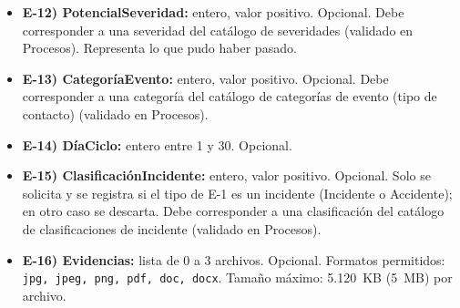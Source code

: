 \begin{itemize}[label={}, leftmargin=1.5em]
  \item \textbf{E-12) PotencialSeveridad:} entero, valor positivo. Opcional. Debe corresponder a una severidad del cat\'alogo de severidades (validado en Procesos). Representa lo que pudo haber pasado.
  \item \textbf{E-13) Categor\'iaEvento:} entero, valor positivo. Opcional. Debe corresponder a una categor\'ia del cat\'alogo de categor\'ias de evento (tipo de contacto) (validado en Procesos).
  \item \textbf{E-14) D\'iaCiclo:} entero entre 1 y 30. Opcional.
  \item \textbf{E-15) Clasificaci\'onIncidente:} entero, valor positivo. Opcional. Solo se solicita y se registra si el tipo de E-1 es un incidente (Incidente o Accidente); en otro caso se descarta. Debe corresponder a una clasificaci\'on del cat\'alogo de clasificaciones de incidente (validado en Procesos).
  \item \textbf{E-16) Evidencias:} lista de 0 a 3 archivos. Opcional. Formatos permitidos: \texttt{jpg, jpeg, png, pdf, doc, docx}. Tama\~no m\'aximo: 5.120~KB (5~MB) por archivo.
\end{itemize}

